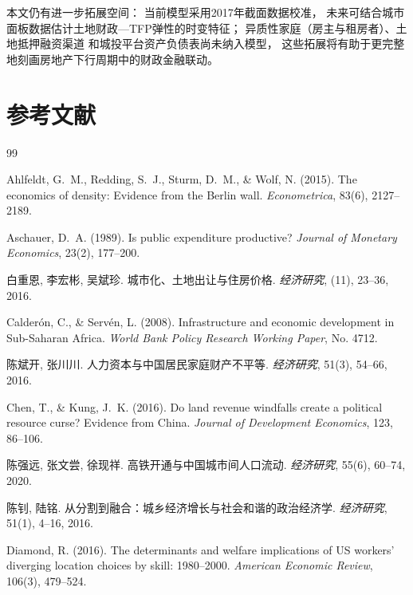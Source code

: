 \documentclass[UTF8,a4paper,12pt]{ctexart}
\theoremstyle{plain}
\theoremstyle{definition}
\theoremstyle{remark}
\begin{document}
本文仍有进一步拓展空间：
当前模型采用2017年截面数据校准，
未来可结合城市面板数据估计土地财政—TFP弹性的时变特征；
异质性家庭（房主与租房者）、土地抵押融资渠道
和城投平台资产负债表尚未纳入模型，
这些拓展将有助于更完整地刻画房地产下行周期中的财政金融联动。

\section*{参考文献}

\begin{thebibliography}{99}

Ahlfeldt, G.~M., Redding, S.~J., Sturm, D.~M., \& Wolf, N. (2015).
The economics of density: Evidence from the Berlin wall.
\textit{Econometrica}, 83(6), 2127--2189.

Aschauer, D.~A. (1989).
Is public expenditure productive?
\textit{Journal of Monetary Economics}, 23(2), 177--200.

白重恩, 李宏彬, 吴斌珍.
城市化、土地出让与住房价格.
\textit{经济研究}, (11), 23--36, 2016.

Calderón, C., \& Servén, L. (2008).
Infrastructure and economic development in Sub-Saharan Africa.
\textit{World Bank Policy Research Working Paper}, No. 4712.

陈斌开, 张川川.
人力资本与中国居民家庭财产不平等.
\textit{经济研究}, 51(3), 54--66, 2016.

Chen, T., \& Kung, J.~K. (2016).
Do land revenue windfalls create a political resource curse?
Evidence from China.
\textit{Journal of Development Economics}, 123, 86--106.

陈强远, 张文尝, 徐现祥.
高铁开通与中国城市间人口流动.
\textit{经济研究}, 55(6), 60--74, 2020.

陈钊, 陆铭.
从分割到融合：城乡经济增长与社会和谐的政治经济学.
\textit{经济研究}, 51(1), 4--16, 2016.

Diamond, R. (2016).
The determinants and welfare implications of US workers' diverging location choices by skill: 1980--2000.
\textit{American Economic Review}, 106(3), 479--524.


\end{thebibliography}
\end{document}
